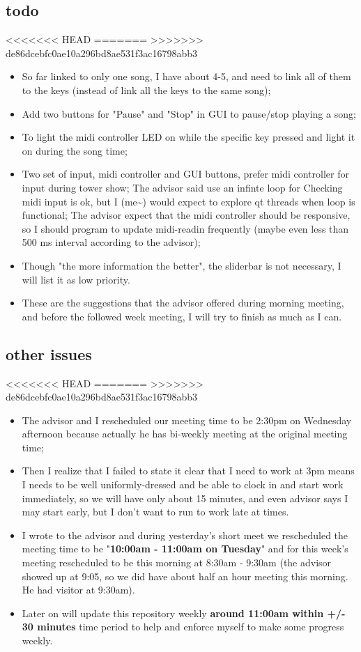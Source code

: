 \documentclass[9pt,b5paper]{article}
\begin{document}
\subsection{todo}
<<<<<<< HEAD
\label{sec-6-2}
=======
\label{sec-5-2}
>>>>>>> de86dcebfc0ae10a296bd8ae531f3ac16798abb3
\begin{itemize}
\item So far linked to only one song, I have about 4-5, and need to link all of them to the keys (instead of link all the keys to the same song);
\item Add two buttons for "Pause" and "Stop" in GUI to pause/stop playing a song;
\item To light the midi controller LED on while the specific key pressed and light it on during the song time;
\item Two set of input, midi controller and GUI buttons, prefer midi controller for input during tower show; The advisor said use an infinte loop for Checking midi input is ok, but I (me\textasciitilde{}) would expect to explore qt threads when loop is functional; The advisor expect that the midi controller should be responsive, so I should program to update midi-readin frequently (maybe even less than 500 ms interval according to the advisor);
\item Though "the more information the better", the sliderbar is not necessary, I will list it as low priority.
\item These are the suggestions that the advisor offered during morning meeting, and before the followed week meeting, I will try to finish as much as I can.
\end{itemize}
\subsection{other issues}
<<<<<<< HEAD
\label{sec-6-3}
=======
\label{sec-5-3}
>>>>>>> de86dcebfc0ae10a296bd8ae531f3ac16798abb3
\begin{itemize}
\item The advisor and I rescheduled our meeting time to be 2:30pm on Wednesday afternoon because actually he has bi-weekly meeting at the original meeting time;
\item Then I realize that I failed to state it clear that I need to work at 3pm means I needs to be well uniformly-dressed and be able to clock in and start work immediately, so we will have only about 15 minutes, and even advisor says I may start early, but I don't want to run to work late at times.
\item I wrote to the advisor and during yesterday's short meet we rescheduled the meeting time to be "\textbf{10:00am - 11:00am on Tuesday}" and for this week's meeting rescheduled to be this morning at 8:30am - 9:30am (the advisor showed up at 9:05, so we did have about half an hour meeting this morning. He had visitor at 9:30am).
\item Later on will update this repository weekly \textbf{around 11:00am within +/- 30 minutes} time period to help and enforce myself to make some progress weekly.
\end{itemize}
\end{document}

